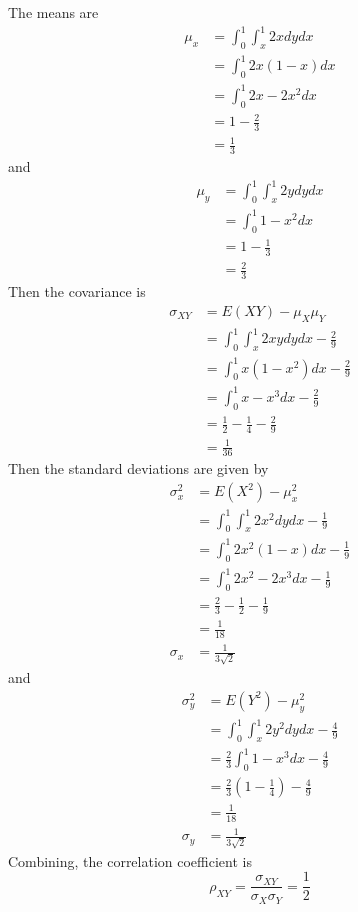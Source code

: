 \documentclass[answers]{exam}
\begin{document}
\begin{questions}
\begin{solution}
	The means are
	\begin{align*}
		\mu_x &= \int_0^1 \int_x^1 2x dydx \\
		      &= \int_0^1 2x(1-x)dx \\
		      &= \int_0^1 2x - 2x^2 dx \\
		      &= 1 - \frac{2}{3} \\
		      &= \frac{1}{3}
	\end{align*}
	and
	\begin{align*}
		\mu_y &= \int_0^1 \int_x^1 2ydydx \\
		      &= \int_0^1 1 - x^2 dx \\
		      &= 1 - \frac{1}{3} \\
		      &= \frac{2}{3}
	\end{align*}
	Then the covariance is
	\begin{align*}
		\sigma_{XY} &= E(XY) - \mu_X\mu_Y \\
			    &= \int_0^1 \int_x^1 2xydydx - \frac{2}{9} \\
			    &= \int_0^1 x(1-x^2)dx - \frac{2}{9} \\
			    &= \int_0^1 x - x^3 dx - \frac{2}{9} \\
			    &= \frac{1}{2} - \frac{1}{4} - \frac{2}{9} \\
			    &= \frac{1}{36}
	\end{align*}
	Then the standard deviations are given by
	\begin{align*}
		\sigma_x^2 &= E(X^2) - \mu_x^2 \\
			   &= \int_0^1 \int_x^1 2x^2 dydx - \frac{1}{9} \\
			   &= \int_0^1 2x^2(1-x)dx - \frac{1}{9} \\
			   &= \int_0^1 2x^2 - 2x^3 dx - \frac{1}{9} \\
			   &= \frac{2}{3} - \frac{1}{2} - \frac{1}{9} \\
			   &= \frac{1}{18} \\
		\sigma_x &= \frac{1}{3\sqrt{2}}
	\end{align*}
	and
	\begin{align*}
		\sigma_y^2 &= E(Y^2) - \mu_y^2 \\
			   &= \int_0^1 \int_x^1 2y^2 dydx - \frac{4}{9} \\
			   &= \frac{2}{3} \int_0^1 1 - x^3 dx - \frac{4}{9} \\
			   &= \frac{2}{3}(1 - \frac{1}{4}) - \frac{4}{9} \\
			   &= \frac{1}{18} \\
		\sigma_y &= \frac{1}{3\sqrt{2}}
	\end{align*}
	Combining, the correlation coefficient is
	$$\rho_{XY} = \frac{\sigma_{XY}}{\sigma_X\sigma_Y} = \frac{1}{2}$$
\end{solution}


\end{questions}
\end{document}
